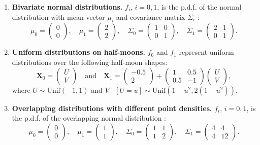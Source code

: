 \documentclass[final,3p,times]{elsarticle}
\newcommand{\vecX}{\mathbf{X}}
\begin{document}
\begin{enumerate}
    \item \textbf{Bivariate normal distributions.} $ f_i $, $i=0,1$, is the p.d.f. of the normal distribution with mean vector $\mu_i$ and covariance matrix $\Sigma_i$ :
    \[
    \mu_0 = \begin{pmatrix} 0 \\ 0 \end{pmatrix}, \quad \mu_1 = \begin{pmatrix} 2 \\ 2 \end{pmatrix},
    \quad \Sigma_0 = \begin{pmatrix} 1 & 0 \\ 0 & 1 \end{pmatrix}, \quad \Sigma_1 = \begin{pmatrix} 2 & 1 \\ 0 & 1 \end{pmatrix}.
    \]

    \item \textbf{Uniform distributions on half-moons.} $ f_0 $ and $ f_1 $ represent  uniform distributions over the following half-moon shapes:
\[
\vecX_0 = \begin{pmatrix} U \\ V \end{pmatrix} \quad \text{and} \quad \vecX_1 = \begin{pmatrix} -0.5 \\ 2 \end{pmatrix} + \begin{pmatrix} 1 & 0.5 \\ 0.5 & -1 \end{pmatrix} \begin{pmatrix} U \\ V \end{pmatrix},
\]
where $ U \sim \text{Unif}(-1, 1) $ and $ V \mid [U = u] \sim \text{Unif}(1 - u^2, 2(1 - u^2)) $.

    \item \textbf{Overlapping distributions with different point densities.} $ f_i $, $i=0,1$, is the p.d.f. of the overlapping normal distribution :
    \[
    \mu_0 = \begin{pmatrix} 0 \\ 0 \end{pmatrix}, \quad \mu_1 = \begin{pmatrix} 1 \\ 1 \end{pmatrix},
    \quad \Sigma_0 = \begin{pmatrix} 1 & 1 \\ 1 & 2 \end{pmatrix}, \quad \Sigma_1 = \begin{pmatrix} 4 & 4 \\ 4 & 12 \end{pmatrix}.
    \]


\end{enumerate}
\end{document}
